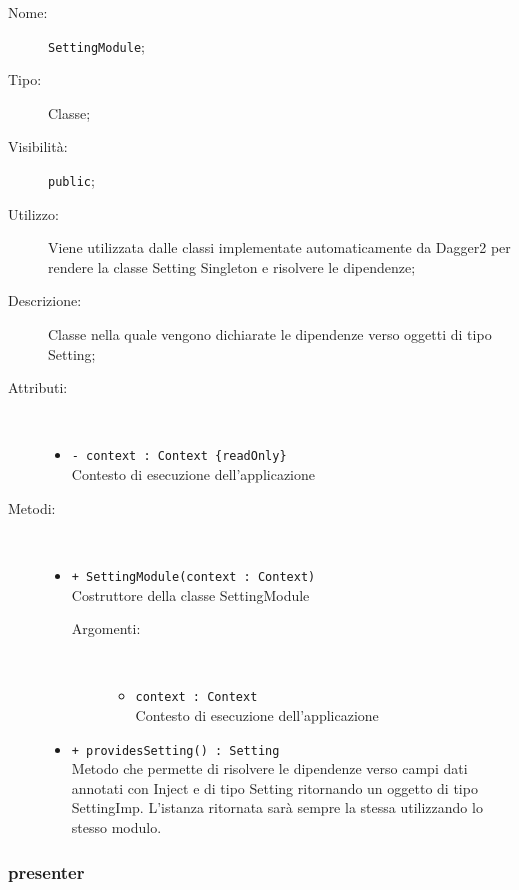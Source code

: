 \documentclass[../DefinizioneDiProdotto.tex]{subfiles}
\begin{document}
\begin{description}
	\item[Nome:] \texttt{SettingModule};
	\item[Tipo:] Classe;
	\item[Visibilità:] \texttt{public};
	\item[Utilizzo:] Viene utilizzata dalle classi implementate automaticamente da Dagger2 per rendere la classe Setting Singleton e risolvere le dipendenze;
	\item[Descrizione:] Classe nella quale vengono dichiarate le dipendenze verso oggetti di tipo Setting;
	\item[Attributi:] \
	\begin{itemize}
		\item \texttt{- context : Context \{readOnly\}}\\
		Contesto di esecuzione dell'applicazione
		
	\end{itemize}
	\item[Metodi:] \
	\begin{itemize}
		\item \texttt{+ SettingModule(context : Context)}\\
		Costruttore della classe SettingModule
		\begin{description}
			\item[Argomenti:] \
			\begin{itemize}
				\item \texttt{context : Context}\\
				Contesto di esecuzione dell'applicazione\end{itemize}
		\end{description}
		\item \texttt{+ providesSetting() : Setting}\\
		Metodo che permette di risolvere le dipendenze verso campi dati annotati con Inject e di tipo Setting ritornando un oggetto di tipo SettingImp. L'istanza ritornata sarà sempre la stessa utilizzando lo stesso modulo.
	\end{itemize}
\end{description}
\subsubsection{presenter}
\end{document}
